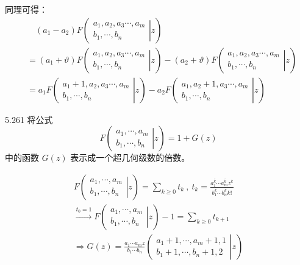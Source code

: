 同理可得：
\begin{align*}
  & \quad (a_1 - a_2) F
  \left( \left.
    \begin{array}{cccc}
      a_1, a_2, a_3 \cdots, a_m \\
      b_1, \cdots, b_n
  \end{array} \right|{z} \right) \\[5pt]
  &= (a_1 + \vartheta) F
  \left( \left.
    \begin{array}{cccc}
      a_1, a_2, a_3 \cdots, a_m \\
      b_1, \cdots, b_n
  \end{array} \right|{z} \right) -
  (a_2 + \vartheta) F
  \left( \left.
    \begin{array}{cccc}
      a_1, a_2, a_3 \cdots, a_m \\
      b_1, \cdots, b_n
  \end{array} \right|{z} \right) \\[5pt]
  &= a_1 F
  \left( \left.
    \begin{array}{cccc}
      a_1+1, a_2, a_3 \cdots, a_m \\
      b_1, \cdots, b_n
  \end{array} \right|{z} \right) -
  a_2 F
  \left( \left.
    \begin{array}{cccc}
      a_1, a_2+1, a_3 \cdots, a_m \\
      b_1, \cdots, b_n
  \end{array} \right|{z} \right)
\end{align*}

\begin{problem}{5.26}{1}
  将公式
  \[
    F
    \left( \left.
      \begin{array}{cccc}
        a_1, \cdots, a_m \\
        b_1, \cdots, b_n
    \end{array} \right|{z} \right) = 1 + G(z)
  \]
  中的函数 \( G(z) \) 表示成一个超几何级数的倍数。
\end{problem}

\begin{gather*}
  F
  \left( \left.
    \begin{array}{cccc}
      a_1, \cdots, a_m \\
      b_1, \cdots, b_n
  \end{array} \right|{z} \right) = \sum_{k \ge 0} t_k \ , \ t_k = \frac{a_1^{\overline{k}} \cdots a_m^{\overline{k}} z^k}{b_1^{\overline{k}} \cdots b_n^{\overline{k}} k!} \\
  \xrightarrow{t_0 = 1} F
  \left( \left.
    \begin{array}{cccc}
      a_1, \cdots, a_m \\
      b_1, \cdots, b_n
  \end{array} \right|{z} \right) - 1 = \sum_{k \ge 0} t_{k+1} \\
  \Rightarrow
  G(z) = \frac{a_1 \cdots a_m z}{b_1 \cdots b_n}
  \left( \left.
    \begin{array}{cccc}
      a_1+1, \cdots, a_m+1, 1 \\
      b_1+1, \cdots, b_n+1, 2
  \end{array} \right|{z} \right)
\end{gather*}


